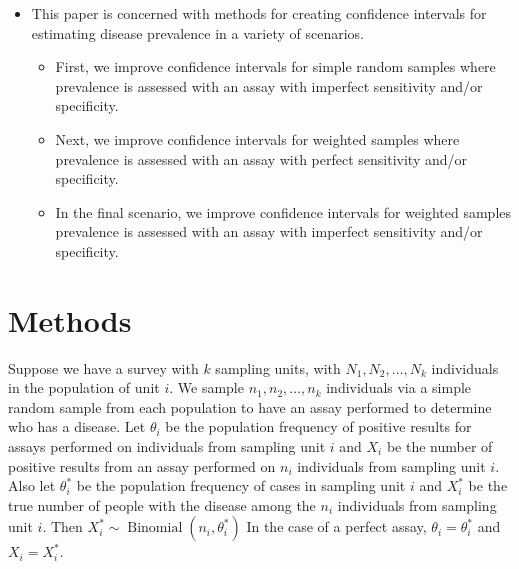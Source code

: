 \documentclass[AMA,STIX1COL]{WileyNJD-v2}
\begin{document}
\begin{itemize}
    \item This paper is concerned with methods for creating confidence intervals for estimating disease prevalence in a variety of scenarios.
    \begin{itemize}
        \item First, we improve confidence intervals for simple random samples where prevalence is assessed with an assay with imperfect sensitivity and/or specificity.
        \item Next, we improve confidence intervals for weighted samples where prevalence is assessed with an assay with perfect sensitivity and/or specificity.
        \item In the final scenario, we improve confidence intervals for weighted samples prevalence is assessed with an assay with imperfect sensitivity and/or specificity.
    \end{itemize}
\end{itemize}

\section{Methods}
Suppose we have a survey with  \( k \) sampling units, with \( N_1, N_2, \ldots, N_k \) individuals in the population of unit \( i \).
We sample \( n_1, n_2, \ldots, n_k \) individuals via a simple random sample from each population to have an assay performed to determine who has a disease.
Let \( \theta_i \) be the population frequency of positive results for assays performed on individuals from sampling unit \( i \) and \( X_i \) be the number of positive results from an assay performed on \( n_i \) individuals from sampling unit \( i \).
Also let \( \theta_i^* \) be the population frequency of cases in sampling unit \( i \) and \( X_i^* \) be the true number of people with the disease among the \( n_i \) individuals from sampling unit \( i \).
Then \( X_i^* \sim \operatorname{Binomial}(n_i, \theta_i^*) \)
In the case of a perfect assay, \( \theta_i = \theta_i^* \) and \( X_i = X_i^* \).
\end{document}
